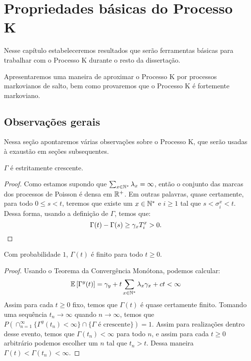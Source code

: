 \chapter{Propriedades básicas do Processo K}
\label{cap:propriedades}

Nesse capítulo estabeleceremos resultados que serão ferramentas
básicas para trabalhar com o Processo K durante o resto da
dissertação.

Apresentaremos uma maneira de aproximar o Processo K por processos
markovianos de salto, bem como provaremos que o Processo K é
fortemente markoviano.


\section{Observações gerais}
\label{sec:observacoes}

Nessa seção apontaremos várias observações sobre o Processo K, que
serão usadas à exaustão em seções subsequentes.

\begin{proposicao}
  \label{prop:gamma-crescente}
  $\Gamma$ é \qc estritamente crescente.
\end{proposicao}
\begin{proof}
  Como estamos supondo que $\sum_{x \in {\mathbb{N^*}}} \lambda_x = \infty$,
  então o conjunto das marcas dos processos de Poisson é \qc densa em
  ${\mathbb{R}}^+$. Em outras palavras, quase certamente, para todo $0 \leq s <
  t$, teremos que existe um $x \in {\mathbb{N^*}}$ e $i \geq 1$ tal que $s <
  \sigma^x_i < t$. Dessa forma, usando a definição de $\Gamma$, temos
  que:
  \begin{displaymath}
    \Gamma(t) - \Gamma(s) \geq \gamma_x T^x_i > 0.
    \qedhere
  \end{displaymath}
\end{proof}

\begin{proposicao}
  \label{prop:gamma-finita}
  Com probabilidade $1$, $\Gamma(t)$ é finito para todo $t \geq 0$.
\end{proposicao}
\begin{proof}
  Usando o Teorema da Convergência Monótona, podemos calcular:
  \begin{displaymath}
    {\mathbb{E}} \left[\Gamma^y(t) \right] = \gamma_y + t \sum_{x \in {\mathbb{N^*}}}
    \lambda_x \gamma_x + ct < \infty
  \end{displaymath}
  Assim para cada $t \geq 0$ fixo, temos que $\Gamma(t)$ é quase
  certamente finito. Tomando uma sequência $t_n \to \infty$ quando $n
  \to \infty$, temos que $P(\cap_{n = 1}^{\infty} \{ \Gamma^y (t_n)
  < \infty \} \cap \{ \Gamma \textrm{ é crescente}\}) = 1$. Assim para
  realizações dentro desse evento, temos que $\Gamma(t_n) < \infty$
  para todo $n$, e assim para cada $t \geq 0$ arbitrário podemos
  escolher um $n$ tal que $t_n > t$. Dessa maneira $\Gamma(t) <
  \Gamma(t_n) < \infty$.
\end{proof}


